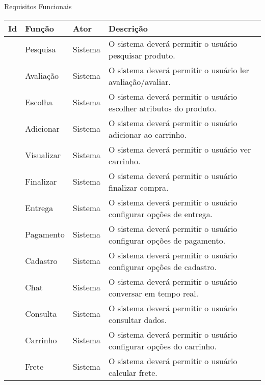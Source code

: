\documentclass[
	12pt,				%
	openright,			%
	twoside,			%
	a4paper,			%
	english,			%
	brazil				%
	]{abntex2}
\begin{document}
\begin{quadro}[htb]
    \caption{\label{quadro_rf}Requisitos Funcionais}
    \small %
    \begin{adjustbox}{center}
        \begin{tabular}{|p{1.5cm}|p{3.5cm}|p{3.5cm}|p{4.5cm}|}
            \hline
            \textbf{Id} & \textbf{Função} & \textbf{Ator} & \textbf{Descrição} \\ \hline
            [RF001] & Pesquisa & Sistema & O sistema deverá permitir o usuário pesquisar produto. \\ \hline
            [RF002] & Avaliação & Sistema & O sistema deverá permitir o usuário ler avaliação/avaliar. \\ \hline
            [RF003] & Escolha & Sistema & O sistema deverá permitir o usuário escolher atributos do produto. \\ \hline
            [RF004] & Adicionar & Sistema & O sistema deverá permitir o usuário adicionar ao carrinho. \\ \hline
            [RF005] & Visualizar & Sistema & O sistema deverá permitir o usuário ver carrinho. \\ \hline
            [RF006] & Finalizar & Sistema & O sistema deverá permitir o usuário finalizar compra. \\ \hline
            [RF007] & Entrega & Sistema & O sistema deverá permitir o usuário configurar opções de entrega. \\ \hline
            [RF008] & Pagamento & Sistema & O sistema deverá permitir o usuário configurar opções de pagamento. \\ \hline
            [RF009] & Cadastro & Sistema & O sistema deverá permitir o usuário configurar opções de cadastro. \\ \hline
            [RF010] & Chat & Sistema & O sistema deverá permitir o usuário conversar em tempo real. \\ \hline
            [RF011] & Consulta & Sistema & O sistema deverá permitir o usuário consultar dados. \\ \hline
            [RF012] & Carrinho & Sistema & O sistema deverá permitir o usuário configurar opções do carrinho. \\ \hline
            [RF013] & Frete & Sistema & O sistema deverá permitir o usuário calcular frete. \\ \hline
        \end{tabular}
    \end{adjustbox}
\end{quadro}
\end{document}
